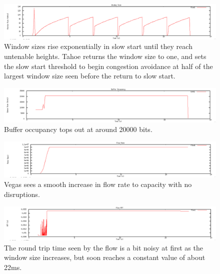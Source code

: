 \documentclass[12pt]{article}
\begin{document}
\begin{figure}[!ht]
\centering \includegraphics[bb= 0 0 1300 250, scale=.35]{figures/Test0_Tahoe/window_size.png}
\caption{Window sizes rise exponentially in slow start until they reach untenable heights. Tahoe returns the window size to one, and sets the slow start threshold to begin congestion avoidance at half of the largest window size seen before the return to slow start.}
\label{fig:test0_tahoe_windnow_size}
\end{figure}

\newpage


\begin{figure}[!ht]
\centering \includegraphics[bb= 0 0 1300 250, scale=.35]{figures/Test0_Vegas/buffer_occ.png}
\caption{Buffer occupancy tops out at around 20000 bits.}
\label{fig:test0_vegas_buffer_occ}
\end{figure}

\begin{figure}[!ht]
\centering \includegraphics[bb= 0 0 1300 250, scale=.35]{figures/Test0_Vegas/flow_rate.png}
\caption{Vegas sees a smooth increase in flow rate to capacity with no disruptions.}
\label{fig:test0_vegas_flow_rate}
\end{figure}

\begin{figure}[!ht]
\centering \includegraphics[bb= 0 0 1300 250, scale=.35]{figures/Test0_Vegas/flow_rtt.png}
\caption{The round trip time seen by the flow is a bit noisy at first as the window size increases, but soon reaches a constant value of about 22ms.}
\label{fig:test0_vegas_flow_rtt}
\end{figure}
\end{document}
